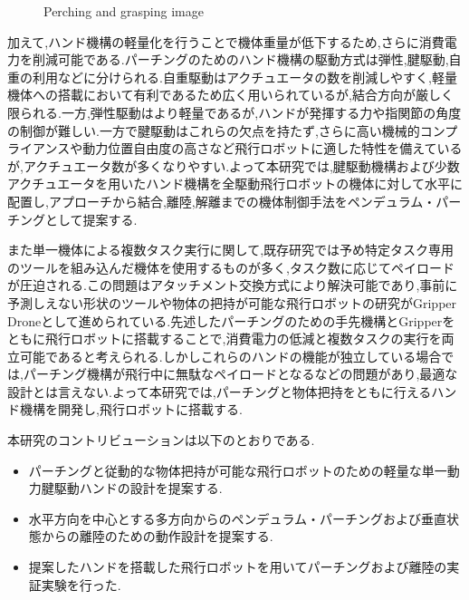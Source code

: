 \documentclass{jarticle}
\begin{document}
\begin{figure}[tb]
\begin{subfigure}{0.68\columnwidth}
    \vspace{-6mm}
    \caption{}
    \label{fig:pgimage}
  \end{subfigure}
  \vspace{2mm}
  \caption{Perching and grasping image}
  \vspace{-5mm}
\end{figure}
加えて,ハンド機構の軽量化を行うことで機体重量が低下するため,さらに消費電力を削減可能である.パーチングのためのハンド機構の駆動方式は弾性\cite{ultra},腱駆動\cite{armed}\cite{tendondriven},自重の利用\cite{SNAG}\cite{selfmass}\cite{selfmass2}などに分けられる.自重駆動はアクチュエータの数を削減しやすく,軽量機体への搭載において有利であるため広く用いられているが,結合方向が厳しく限られる.一方,弾性駆動はより軽量であるが,ハンドが発揮する力や指関節の角度の制御が難しい.一方で腱駆動はこれらの欠点を持たず,さらに高い機械的コンプライアンスや動力位置自由度の高さなど飛行ロボットに適した特性を備えているが,アクチュエータ数が多くなりやすい.よって本研究では,腱駆動機構および少数アクチュエータを用いたハンド機構を全駆動飛行ロボットの機体に対して水平に配置し,アプローチから結合,離陸,解離までの機体制御手法をペンデュラム・パーチングとして提案する.

また単一機体による複数タスク実行に関して,既存研究では予め特定タスク専用のツールを組み込んだ機体を使用するものが多く,タスク数に応じてペイロードが圧迫される.この問題はアタッチメント交換方式により解決可能であり,事前に予測しえない形状のツールや物体の把持が可能な飛行ロボットの研究がGripper Droneとして進められている.先述したパーチングのための手先機構とGripperをともに飛行ロボットに搭載することで,消費電力の低減と複数タスクの実行を両立可能であると考えられる.しかしこれらのハンドの機能が独立している場合では,パーチング機構が飛行中に無駄なペイロードとなるなどの問題があり,最適な設計とは言えない.よって本研究では,パーチングと物体把持をともに行えるハンド機構を開発し,飛行ロボットに搭載する.

本研究のコントリビューションは以下のとおりである.

\begin{itemize}
  \item パーチングと従動的な物体把持が可能な飛行ロボットのための軽量な単一動力腱駆動ハンドの設計を提案する.
  \item 水平方向を中心とする多方向からのペンデュラム・パーチングおよび垂直状態からの離陸のための動作設計を提案する.
  \item 提案したハンドを搭載した飛行ロボットを用いてパーチングおよび離陸の実証実験を行った.
\end{itemize}
\end{document}
